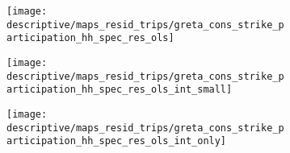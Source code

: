 \vspace*{\fill}\clearpage
\begin{landscape}
	\vspace*{\fill}
	\begin{figure}[H]\centering
		\caption{Strike participation in Hamburg using alternative participation measures}
		\label{fig_greta_cons:strike_participation_hh_different_measure}
		\begin{subfigure}[h]{0.22\linewidth}\centering
			\texttt{[image: descriptive/maps\_resid\_trips/greta\_cons\_strike\_participation\_hh\_spec\_res\_ols]}
		\end{subfigure}
		\begin{subfigure}[h]{0.22\linewidth}\centering
			\texttt{[image: descriptive/maps\_resid\_trips/greta\_cons\_strike\_participation\_hh\_spec\_res\_ols\_int\_small]}
		\end{subfigure}
		\begin{subfigure}[h]{0.22\linewidth}\centering
			\texttt{[image: descriptive/maps\_resid\_trips/greta\_cons\_strike\_participation\_hh\_spec\_res\_ols\_int\_only]}
		\end{subfigure}
		

\end{figure}
\end{landscape}
